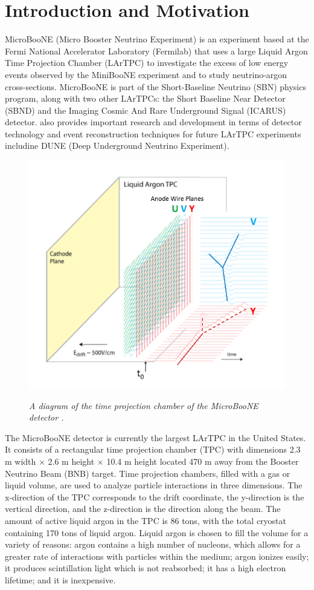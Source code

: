 \section{Introduction and Motivation}

MicroBooNE (Micro Booster Neutrino Experiment) is an experiment based at the Fermi National Accelerator Laboratory (Fermilab) that uses a large Liquid Argon Time Projection Chamber (LArTPC) to investigate the excess of low energy events observed by the MiniBooNE experiment \cite{Aguilar-Arevalo:2013pmq} and to study neutrino-argon cross-sections. MicroBooNE is part of the Short-Baseline Neutrino (SBN) physics program, along with two other LArTPCs: the Short Baseline Near Detector (SBND) and the Imaging Cosmic And Rare Underground Signal (ICARUS) detector. {\ub} also provides important research and development in terms of detector technology and event reconstruction techniques for future LArTPC experiments includine DUNE (Deep Underground Neutrino Experiment).\\

\begin{figure}[h!]
\centering
	\includegraphics[width=0.4\linewidth]{Figures/detector2.png} \\
\caption{\textit{A diagram of the time projection chamber of the MicroBooNE detector \cite{lartpc}.}}\label{detector_fig}
\end{figure}

The MicroBooNE detector is currently the largest LArTPC in the United States. It consists of a rectangular time projection chamber (TPC) with dimensions 2.3 m width $\times$ 2.6 m height $\times$ 10.4 m height located 470 m away from the Booster Neutrino Beam (BNB) target. Time projection chambers, filled with a gas or liquid volume, are used to analyze particle interactions in three dimensions. The x-direction of the TPC corresponds to the drift coordinate, the y-direction is the vertical direction, and the z-direction is the direction along the beam. The amount of active liquid argon in the TPC is 86 tons, with the total cryostat containing 170 tons of liquid argon. Liquid argon is chosen to fill the volume for a variety of reasons: argon contains a high number of nucleons, which allows for a greater rate of interactions with particles within the medium; argon ionizes easily; it produces scintillation light which is not reabsorbed; it has a high electron lifetime; and it is inexpensive.\\

